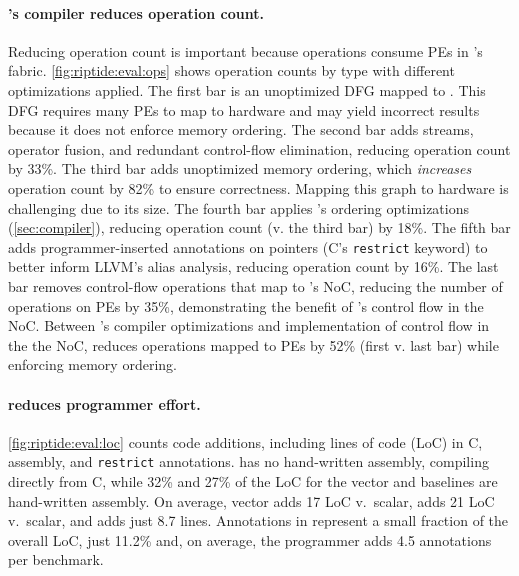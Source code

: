\paragraph{\riptide's compiler reduces operation count.} Reducing operation count
is important because operations consume PEs in \riptide's fabric.
%
\autoref{fig:riptide:eval:ops} shows operation counts by type with different optimizations applied.
% 
The first bar is an unoptimized DFG mapped to \riptide.
% 
This DFG requires many PEs to map to hardware and may yield incorrect
results because it does not enforce memory ordering.
% 
The second bar adds streams, operator fusion, and redundant control-flow
elimination, reducing operation count by 33\%.
% 
The third bar adds unoptimized memory ordering, which {\em increases} operation count by 82\% to ensure correctness.
% 
Mapping this graph to hardware is challenging due to its size.
% 
The fourth bar applies \riptide's ordering optimizations (\autoref{sec:compiler}), reducing operation count (v. the third bar) by 18\%.
% 
The fifth bar adds programmer-inserted annotations on pointers (C's {\tt restrict} keyword)
to better inform LLVM's alias analysis, reducing operation count by 16\%.
% 
% 
The last bar removes control-flow operations that map to \riptide's NoC, reducing
the number of operations on PEs by 35\%, demonstrating the benefit of
\riptide's control flow in the NoC.
% 
Between \riptide's compiler optimizations and implementation of control flow in the the NoC, \riptide reduces operations mapped to PEs by 52\% (first v. last bar) while enforcing memory ordering.
% 
\figRipTideLoCResults

\paragraph{\riptide reduces programmer effort.}
\autoref{fig:riptide:eval:loc} counts code additions, including lines of code (LoC) in C, assembly, and {\tt restrict} annotations.  
%
% 
\riptide has no hand-written assembly, compiling directly from C, while  32\% and
27\% of the LoC for the vector and \snafu baselines are hand-written assembly.
% 
On average, vector adds 17 LoC v.\ scalar, \snafu adds 21 LoC v.\ scalar, and
\riptide adds just 8.7 lines.
% 
Annotations in \riptide represent a small fraction of the overall LoC, just 11.2\%
and, on average, the programmer adds 4.5 annotations per benchmark.


